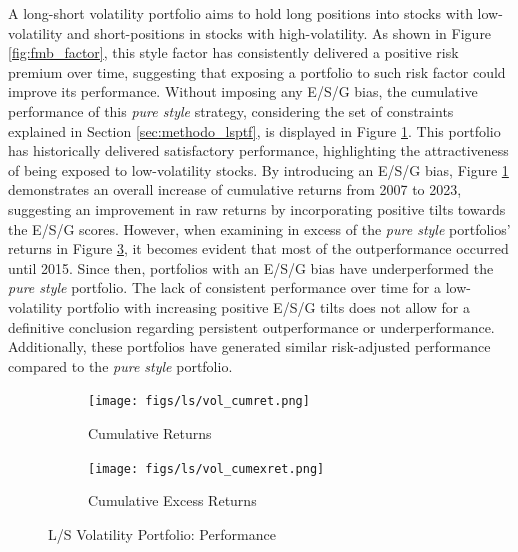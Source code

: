 \documentclass[11pt,a4paper]{article}
\begin{document}
A long-short volatility portfolio aims to hold long positions into stocks with low-volatility and short-positions in stocks with high-volatility. 
As shown in Figure \ref{fig:fmb_factor}, this style factor has consistently delivered a positive risk premium over time, suggesting that exposing a portfolio to such risk factor could improve its performance.
Without imposing any E/S/G bias, the cumulative performance of this \textit{pure style} strategy, considering the set of constraints explained in Section \ref{sec:methodo_lsptf}, is displayed in Figure \ref{fig:vol_cumret}.
This portfolio has historically delivered satisfactory performance, highlighting the attractiveness of being exposed to low-volatility stocks.
By introducing an E/S/G bias, Figure \ref{fig:vol_cumret} demonstrates an overall increase of cumulative returns from 2007 to 2023, suggesting an improvement in raw returns by incorporating positive tilts towards the E/S/G scores.
However, when examining in excess of the \textit{pure style} portfolios' returns in Figure \ref{fig:vol_cumexret}, it becomes evident that most of the outperformance occurred until 2015. Since then, portfolios with an E/S/G bias have underperformed the \textit{pure style} portfolio.
The lack of consistent performance over time for a low-volatility portfolio with increasing positive E/S/G tilts does not allow for a definitive conclusion regarding persistent outperformance or underperformance.
Additionally, these portfolios have generated similar risk-adjusted performance compared to the \textit{pure style} portfolio.    

\begin{figure}[h!]
    \centering
    \begin{subfigure}{.5\textwidth}
        \centering
        \texttt{[image: figs/ls/vol\_cumret.png]}
        \caption{Cumulative Returns}
        \label{fig:vol_cumret}
    \end{subfigure}%
    \begin{subfigure}{.5\textwidth}
      \centering
      \texttt{[image: figs/ls/vol\_cumexret.png]}
      \caption{Cumulative Excess Returns}
      \label{fig:vol_cumexret}
    \end{subfigure}
    \caption{L/S Volatility Portfolio: Performance}
\end{figure}

\begin{center}
    
    \label{tab:vol_stats}
\end{center}
\end{document}
